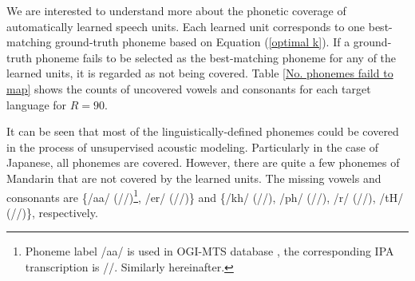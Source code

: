 \documentclass[a4paper]{article}
\begin{document}
We are interested to understand more about the phonetic coverage of automatically learned speech units.  
Each learned unit corresponds to one best-matching ground-truth phoneme based on Equation (\ref{optimal k}).
If a ground-truth phoneme fails to be selected as the best-matching phoneme for any of the learned units, it is regarded as not being covered. Table \ref{No. phonemes faild to map} shows the counts of uncovered vowels and consonants for each target language for $R=90$.
\begin{table}[htbp]
  \centering
    \caption{Uncovered/total No. vowels and consonants ($R=90$)}
    \renewcommand\arraystretch{1}
  \label{No. phonemes faild to map}
\end{table}
It can be seen that most of the linguistically-defined phonemes could be covered in the process of unsupervised acoustic modeling. Particularly in the case of Japanese, all phonemes are covered. However, there are quite a few phonemes of Mandarin that are not covered by the learned units. The missing vowels and consonants are \{/aa/ (//)\footnote{Phoneme label /aa/ is used in OGI-MTS database \cite{MuthusamyColeOshika1992}, the corresponding IPA transcription is //. Similarly hereinafter.}, /er/ (/\textrhookschwa/)\} and \{/kh/ (//), /ph/ (//), /r/ (//), /tH/ (//)\}, respectively.
\end{document}
